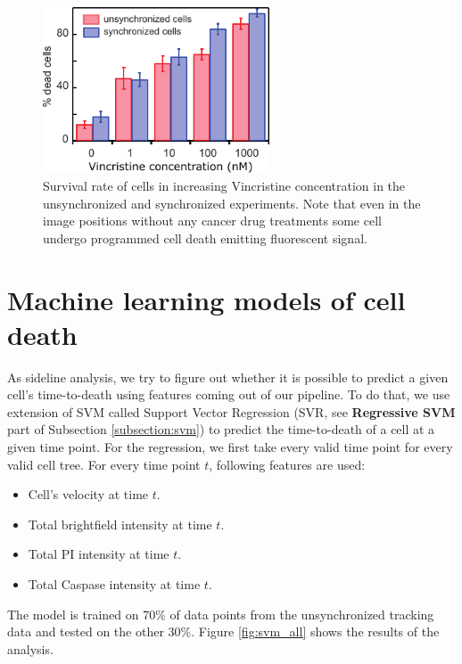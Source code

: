 \documentclass[pdftex,12pt,a4paper]{report}
\begin{document}
\begin{figure}[H]
\centering
\includegraphics[width=0.6\textwidth]{images/conc_effect/conc_effect.pdf}
\caption{Survival rate of cells in increasing Vincristine concentration in the unsynchronized and synchronized experiments. Note that even in the image positions without any cancer drug treatments some cell undergo programmed cell death emitting fluorescent signal.}
\label{fig:conc_effect}
\end{figure}

\section{Machine learning models of cell death}
\label{section:ml_results}

As sideline analysis, we try to figure out whether it is possible to predict a given cell's time-to-death using features coming out of our pipeline. To do that, we use extension of SVM called Support Vector Regression (SVR, see \textbf{Regressive SVM} part of Subsection \ref{subsection:svm}) to predict the time-to-death of a cell at a given time point. For the regression, we first take every valid time point for every valid cell tree. For every time point $t$, following features are used:

\begin{itemize}
\item Cell's velocity at time $t$.
\item Total brightfield intensity at time $t$.
\item Total PI intensity at time $t$.
\item Total Caspase intensity at time $t$.
\end{itemize}

The model is trained on 70\% of data points from the unsynchronized tracking data and tested on the other 30\%. Figure \ref{fig:svm_all} shows the results of the analysis.
\end{document}

